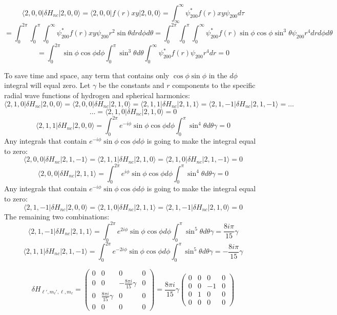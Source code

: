 \documentclass[11pt]{article}
\def\l{\ell}
\def\la{\langle}
\def\ra{\rangle}
\def\sp{\vspace{3mm}}
\newcommand{\Matrix}[1]{\begin{pmatrix} #1 \end{pmatrix}}
\theoremstyle{pink}
\theoremstyle{boxedsolution}
\theoremstyle{definition}
\theoremstyle{claim}
\begin{document}
\newpage
\[\la2,0,0|\delta H_{nc}|2,0,0\ra = \la2,0,0| f(r)xy|2,0,0\ra=
\int^\infty_\infty\psi^*_{200}f(r)xy\psi_{200}d\tau \]
\vspace{3mm}
\[=\int^{2\pi}_0\int^{\pi}_0\int^\infty_0\psi^*_{200}f(r)xy\psi_{200}r^2\sin\theta dr d\phi d\theta=\int^{2\pi}_0\int^{\pi}_0\int^\infty_0\psi^*_{200}f(r)\sin\phi\cos\phi\sin^3\theta\psi_{200}r^4dr d\phi d\theta\]
\vspace{3mm}
\[=\int^{2\pi}_0\sin\phi\cos\phi d\phi
\int^{\pi}_0\sin^3\theta d\theta
\int^\infty_0\psi^*_{200}f(r)\psi_{200}r^4dr=0 \]


To save time and space, any term that contains only $\cos\phi\sin\phi$ in the $d\phi$ integral will equal zero. Let $\gamma$ be the constants and $r$ components to the specific radial wave functions of hydrogen and spherical harmonics:
\vspace{3mm}
\[\Big\la 2,1,0\Big|\delta H_{nc}\Big|2,0,0\Big\ra = \Big\la 2,0,0\Big|\delta H_{nc}\Big|2,1,0\Big\ra = \Big\la 2,1,1\Big|\delta H_{nc}\Big|2,1,1\Big\ra = \Big\la 2,1,-1\Big|\delta H_{nc}\Big|2,1,-1\Big\ra=\dots \]
\sp
\[\dots = \Big\la 2,1,0\Big|\delta H_{nc}\Big|2,1,0\Big\ra =0 \]
\sp
\[\Big\la 2,1,1\Big|\delta H_{nc}\Big|2,0,0\Big\ra=\int^{2\pi}_0e^{-i\phi}\sin\phi\cos\phi d\phi\int^\pi_0\sin^4\theta d\theta\gamma = 0 \]
Any integrals that contain $e^{-i\phi}\sin\phi\cos\phi d\phi$ is going to make the integral equal to zero:
\sp
\[\Big\la 2,0,0\Big|\delta H_{nc}\Big|2,1,-1\Big\ra = \Big\la 2,1,1\Big|\delta H_{nc}\Big|2,1,0\Big\ra = \Big\la 2,1,0\Big|\delta H_{nc}\Big|2,1,-1\Big\ra = 0\]
\sp
\[\Big\la 2,0,0\Big|\delta H_{nc}\Big|2,1,1\Big\ra=\int^{2\pi}_0e^{i\phi}\sin\phi\cos\phi d\phi\int^\pi_0\sin^4\theta d\theta\gamma = 0\]
Any integrals that contain $e^{-i\phi}\sin\phi\cos\phi d\phi$ is going to make the integral equal to zero:
\[\Big\la 2,1,-1\Big|\delta H_{nc}\Big|2,0,0\Big\ra=\Big\la 2,1,0\Big|\delta H_{nc}\Big|2,1,1\Big\ra=\Big\la 2,1,-1\Big|\delta H_{nc}\Big|2,1,0\Big\ra=0\]
\sp
The remaining two combinations:
\[\Big\la 2,1,-1\Big|\delta H_{nc}\Big|2,1,1\Big\ra=\int^{2\pi}_0e^{2i\phi}\sin\phi\cos\phi d\phi\int^{\pi}_0\sin^5\theta d\theta\gamma=\frac{8i\pi}{15}\gamma\]
\sp
\[\Big\la 2,1,1\Big|\delta H_{nc}\Big|2,1,-1\Big\ra=\int^{2\pi}_0e^{-2i\phi}\sin\phi\cos\phi d\phi\int^{\pi}_0\sin^5\theta d\theta\gamma=-\frac{8i\pi}{15}\gamma\]




\newpage
\[\delta H_{\l',m_\l',\l,m_\l}=\Matrix{
0 & 0 & 0 & 0\\
0 & 0 & -\frac{8\pi i}{15}\gamma & 0\\
0 & \frac{8\pi i}{15}\gamma & 0 & 0\\
0 & 0 & 0 & 0
}=\frac{8\pi i}{15}\gamma\Matrix{
0 & 0 & 0 & 0\\
0 & 0 & -1 & 0\\
0 & 1 & 0 & 0\\
0 & 0 & 0 & 0
}\]
\end{document}
